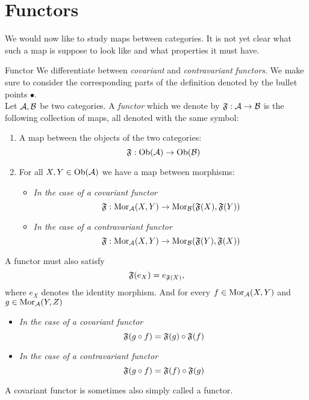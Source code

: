 \section{Functors}
We would now like to study maps between categories. It is not yet clear what such a map is suppose to look like and what properties it must have.

\begin{definition}{Functor}{}
We differentiate between \emph{covariant} and \emph{contravariant} \emph{functors}. 
We make sure to consider the corresponding parts of the definition denoted by the bullet points $\bullet$.\\

Let $\mathcal{A}, \mathcal{B}$ be two categories. A \emph{functor} which we denote by $\mathfrak{F}: \mathcal{A} \to \mathcal{B}$ is the following collection of maps, all denoted with the same symbol:
\begin{enumerate}
    \item A map between the objects of the two categories:
    $$
    \mathfrak{F}: \mathrm {Ob}(\mathcal{A}) \to \mathrm {Ob}(\mathcal{B})
    $$
    \item For all $X,Y \in \mathrm {Ob}(\mathcal{A})$ we have a map between morphisms: 
    \begin{itemize}
        \item \emph{In the case of a covariant functor} $$\mathfrak{F}: \mathrm {Mor}_{\mathcal{A}}(X,Y) \to \mathrm {Mor}_{\mathcal{B}}(\mathfrak{F}(X), \mathfrak{F}(Y))$$
        \item \emph{In the case of a contravariant functor} $$\mathfrak{F}: \mathrm {Mor}_{\mathcal{A}}(X,Y) \to \mathrm {Mor}_{\mathcal{B}}(\mathfrak{F}(Y), \mathfrak{F}(X))$$
    \end{itemize}
\end{enumerate}
A functor must also satisfy
\begin{equation}
\label{eq:functor_functoriality_identity}
\mathfrak{F}(e_X) = e_{\mathfrak{F}(X)},
\end{equation}
where $e_X$ denotes the identity morphism. And for every $f \in \mathrm {Mor}_{\mathcal{A}}(X,Y)$ and $g \in \mathrm {Mor}_{\mathcal{A}}(Y,Z)$
\begin{itemize}
    \item \emph{In the case of a covariant functor}
    \begin{equation}
    \label{eq:functor_functoriality_covar}
    \mathfrak{F}(g \circ f) = \mathfrak{F}(g) \circ \mathfrak{F}(f)
    \end{equation}
    
    \item \emph{In the case of a contravariant functor}
    \begin{equation}
    \label{eq:functor_functoriality_contravar}
    \mathfrak{F}(g \circ f) = \mathfrak{F}(f) \circ \mathfrak{F}(g)
    \end{equation}
\end{itemize}
A covariant functor is sometimes also simply called a functor.
\end{definition}

